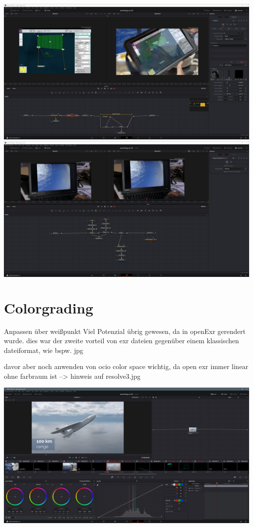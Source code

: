 \includegraphics[width=\textwidth]{gfx/post/resolve9.jpg}
\includegraphics[width=\textwidth]{gfx/post/resolve10.jpg}


\section{Colorgrading}

Anpassen über weißpunkt
Viel Potenzial übrig gewesen, da in openExr gerendert wurde.
dies war der zweite vorteil von exr dateien gegenüber einem klassischen dateiformat, wie bspw. jpg

davor aber noch anwenden von ocio color space wichtig, da open exr immer linear ohne farbraum ist
--> hinweis auf resolve3.jpg


\includegraphics[width=\textwidth]{gfx/post/resolve7.jpg}

